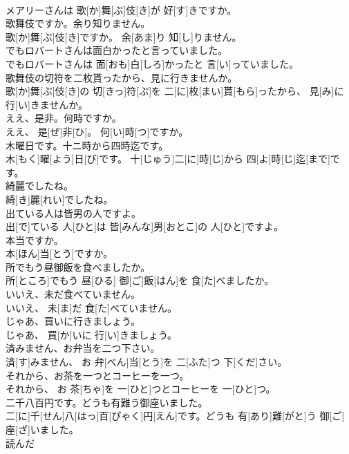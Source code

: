 \documentclass[8pt]{extreport}
\begin{document}
\begin{CJK}{UTF8}{min}
\\	メアリーさんは 歌[か]舞[ぶ]伎[き]が 好[す]きですか。
\\	歌舞伎ですか。余り知りません。	
\\	歌[か]舞[ぶ]伎[き]ですか。 余[あま]り 知[し]りません。
\\	でもロバートさんは面白かったと言っていました。	
\\	でもロバートさんは 面[おも]白[しろ]かったと 言[い]っていました。
\\	歌舞伎の切符を二枚貰ったから、見に行きませんか。	
\\	歌[か]舞[ぶ]伎[き]の 切[きっ]符[ぷ]を 二[に]枚[まい]貰[もら]ったから、 見[み]に 行[い]きませんか。
\\	ええ、是非。何時ですか。	
\\	ええ、 是[ぜ]非[ひ]。 何[い]時[つ]ですか。
\\	木曜日です。十ニ時から四時迄です。	
\\	木[もく]曜[よう]日[び]です。 十[じゅう]二[に]時[じ]から 四[よ]時[じ]迄[まで]です。
\\	綺麗でしたね。	
\\	綺[き]麗[れい]でしたね。
\\	出ている人は皆男の人ですよ。	
\\	出[で]ている 人[ひと]は 皆[みんな]男[おとこ]の 人[ひと]ですよ。
\\	本当ですか。	
\\	本[ほん]当[とう]ですか。	
\\	所でもう昼御飯を食べましたか。	
\\	所[ところ]でもう 昼[ひる] 御[ご]飯[はん]を 食[た]べましたか。
\\	いいえ、未だ食べていません。	
\\	いいえ、 未[ま]だ 食[た]べていません。
\\	じゃあ、買いに行きましょう。	
\\	じゃあ、 買[か]いに 行[い]きましょう。
\\	済みません、お弁当を二つ下さい。	
\\	済[す]みません、 お 弁[べん]当[とう]を 二[ふた]つ 下[くだ]さい。
\\	それから、お茶を一つとコーヒーを一つ。	
\\	それから、 お 茶[ちゃ]を 一[ひと]つとコーヒーを 一[ひと]つ。
\\	二千八百円です。どうも有難う御座いました。	
\\	二[に]千[せん]八[はっ]百[ぴゃく]円[えん]です。どうも 有[あり]難[がと]う 御[ご]座[ざ]いました。
\\	読んだ 

\end{CJK}
\end{document}
